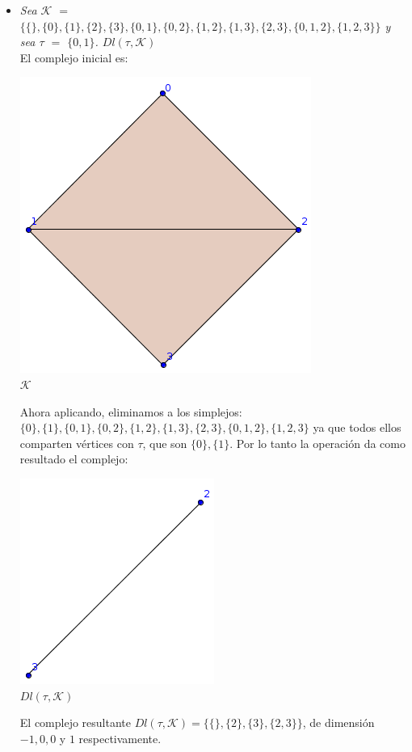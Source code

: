 \documentclass{article}
\begin{document}
\begin{enumerate}
{    \begin{itemize}
    \item{
        \textsl{
          Sea $\mathcal{K}$ $=$ $\{\{\}, \{0\}, \{1\}, \{2\}, \{3\},
          \{0,1\}, \{0,2\}, \{1,2\}, \{1,3\}, \{2,3\}, \{0,1,2\},
          \{1,2,3\} \}$ y sea $\tau$ $=$ $\{0,1\}$. $Dl(\tau,\mathcal{K})$
        }\\
       
        El complejo inicial es:
        \begin{center}
          \includegraphics[scale=0.4]{entrada3_1.png}
          \\ $\mathcal{K}$
        \end{center}
        Ahora aplicando, eliminamos a los simplejos: $\{0\}, \{1\}, \{0,1\},
        \{0,2\}, \{1,2\}, \{1,3\}, \{2,3\}, \{0,1,2\},
        \{1,2,3\}$ ya que todos ellos comparten vértices con $\tau$, que son
        $\{0\}, \{1\}$. Por lo tanto la operación da como resultado el complejo:
        \begin{center}
          \includegraphics[scale=0.4]{salida3_1.png}
          \\ $Dl(\tau,\mathcal{K})$
        \end{center}
        El complejo resultante $Dl(\tau,\mathcal{K}) = \{\{\}, \{2\}, \{3\}, \{2,3\}\}$,
        de dimensión $-1, 0, 0$ y $1$ respectivamente.
      }
      

\end{itemize}}
\end{enumerate}
\end{document}
